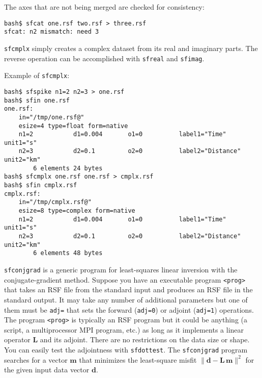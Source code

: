 The axes that are not being merged are checked for consistency:
\begin{verbatim}
bash$ sfcat one.rsf two.rsf > three.rsf
sfcat: n2 mismatch: need 3
\end{verbatim}

\noindent\doublebox{\parbox{\textwidth}{

}}

\texttt{sfcmplx} simply creates a complex dataset from its real and
imaginary parts. The reverse operation can be accomplished with
\texttt{sfreal} and \texttt{sfimag}.

Example of \texttt{sfcmplx}:
\begin{verbatim}
bash$ sfspike n1=2 n2=3 > one.rsf
bash$ sfin one.rsf
one.rsf:
    in="/tmp/one.rsf@"
    esize=4 type=float form=native
    n1=2           d1=0.004       o1=0          label1="Time" unit1="s"
    n2=3           d2=0.1         o2=0          label2="Distance" unit2="km"
        6 elements 24 bytes
bash$ sfcmplx one.rsf one.rsf > cmplx.rsf
bash$ sfin cmplx.rsf
cmplx.rsf:
    in="/tmp/cmplx.rsf@"
    esize=8 type=complex form=native
    n1=2           d1=0.004       o1=0          label1="Time" unit1="s"
    n2=3           d2=0.1         o2=0          label2="Distance" unit2="km"
        6 elements 48 bytes
\end{verbatim}

\noindent\doublebox{\parbox{\textwidth}{
    
}}

\texttt{sfconjgrad} is a generic program for least-squares linear
inversion with the conjugate-gradient method. Suppose you have an
executable program \texttt{<prog>} that takes an RSF file from the
standard input and produces an RSF file in the standard output. It may
take any number of additional parameters but one of them must be
\texttt{adj=} that sets the forward (\texttt{adj=0}) or adjoint
(\texttt{adj=1}) operations.  The program \texttt{<prog>} is typically
an RSF program but it could be anything (a script, a multiprocessor
MPI program, etc.) as long as it implements a linear operator
$\mathbf{L}$ and its adjoint. There are no restrictions on the data
size or shape. You can easily test the adjointness with
\texttt{sfdottest}. The \texttt{sfconjgrad} program searches for a
vector $\mathbf{m}$ that minimizes the least-square misfit 
$\|\mathbf{d - L\,m}\|^2$ for the given input data vector $\mathbf{d}$.

